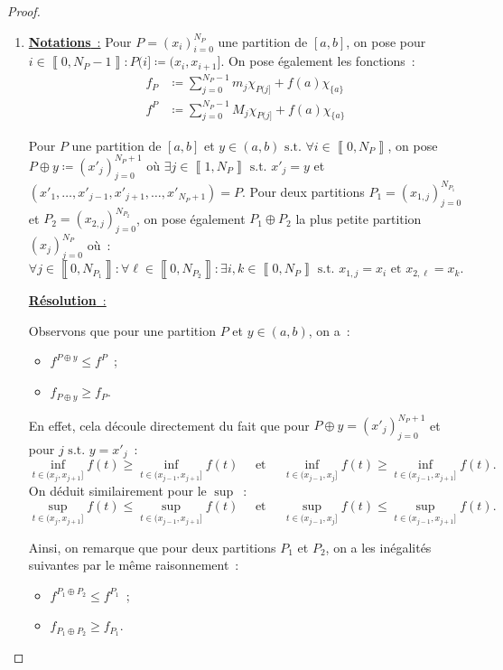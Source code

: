 \documentclass{article}
\theoremstyle{definition}
\newcommand{\st}{\text{ s.t. }}
\newcommand{\intint}[2]{\left\llbracket#1, #2\right\rrbracket}
\begin{document}
\begin{proof}~
\begin{enumerate}
	\item \underline {\textbf {Notations}~:}
	Pour $P = (x_i)_{i=0}^{N_P}$ une partition de $[a, b]$, on pose pour $i \in \intint 0{N_P-1} : P(i] \coloneqq (x_i, x_{i+1}]$. On pose également les fonctions~:
	\begin{align*}
		f_P &\coloneqq \sum_{j=0}^{N_P - 1}m_j\chi_{P(j]} + f(a)\chi_{\{a\}} \\
		f^P &\coloneqq \sum_{j=0}^{N_P - 1}M_j\chi_{P(j]} + f(a)\chi_{\{a\}}
	\end{align*}

	Pour $P$ une partition de $[a, b]$ et $y \in (a, b) \st \forall i \in \intint 0{N_P}$, on pose $P \oplus y \coloneqq (x'_j)_{j=0}^{N_P+1}$ où
	$\exists j \in \intint 1{N_P} \st x'_j = y$ et $(x'_1, \ldots, x'_{j-1}, x'_{j+1}, \ldots, x'_{N_P+1}) = P$. Pour deux partitions
	$P_1 = (x_{1,j})_{j=0}^{N_{P_1}}$ et $P_2 = (x_{2,j})_{j=0}^{N_{P_2}}$, on pose également $P_1 \oplus P_2$ la plus petite partition $(x_j)_{j=0}^{N_P}$ où~:
	\[\forall j \in \intint 0{N_{P_1}} : \forall \ell \in \intint 0{N_{P_2}} : \exists i, k \in \intint 0{N_P}	\st x_{1,j} = x_i \text{ et } x_{2,\ell} = x_k.\]

	\underline {\textbf {Résolution}~:}

	Observons que pour une partition $P$ et $y \in (a, b)$, on a~:
	\begin{itemize}
		\item $f^{P \oplus y} \leq f^P$~;
		\item $f_{P \oplus y} \geq f_P$.
	\end{itemize}

	En effet, cela découle directement du fait que pour $P \oplus y = (x'_j)_{j=0}^{N_P+1}$ et pour $j \st y = x'_j$~:
	\[\inf_{t \in (x_j, x_{j+1}]}f(t) \geq \inf_{t \in (x_{j-1}, x_{j+1}]}f(t) \quad\text{ et }\quad \inf_{t \in (x_{j-1}, x_j]}f(t) \geq \inf_{t \in (x_{j-1}, x_{j+1}]}f(t).\]
	On déduit similairement pour le $\sup$~:
	\[\sup_{t \in (x_j, x_{j+1}]}f(t) \leq \sup_{t \in (x_{j-1}, x_{j+1}]}f(t) \quad\text{ et }\quad \sup_{t \in (x_{j-1}, x_j]}f(t) \leq \sup_{t \in (x_{j-1}, x_{j+1}]}f(t).\]

	Ainsi, on remarque que pour deux partitions $P_1$ et $P_2$, on a les inégalités suivantes par le même raisonnement~:
	\begin{itemize}
		\item $f^{P_1 \oplus P_2} \leq f^{P_1}$~;
		\item $f_{P_1 \oplus P_2} \geq f_{P_1}$.
	\end{itemize}


\end{enumerate}
\end{proof}
\end{document}
